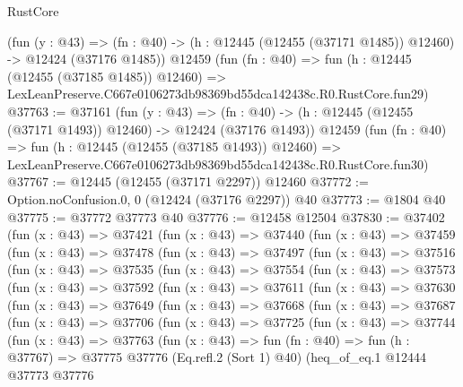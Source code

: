 \begin{lexlean}{RustCore}
\begin{coremodule}
    (fun (y : @43) =>
    (fn : @40) -> (h : @12445 (@12455 (@37171 @1485)) @12460) -> @12424 (@37176 @1485))
    @12459
    (fun (fn : @40) =>
    fun (h : @12445 (@12455 (@37185 @1485)) @12460) =>
    LexLeanPreserve.C667e0106273db98369bd55dca142438c.R0.RustCore.fun29)
@37763 := @37161
    (fun (y : @43) =>
    (fn : @40) -> (h : @12445 (@12455 (@37171 @1493)) @12460) -> @12424 (@37176 @1493))
    @12459
    (fun (fn : @40) =>
    fun (h : @12445 (@12455 (@37185 @1493)) @12460) =>
    LexLeanPreserve.C667e0106273db98369bd55dca142438c.R0.RustCore.fun30)
@37767 := @12445 (@12455 (@37171 @2297)) @12460
@37772 := Option.noConfusion.{0, 0} (@12424 (@37176 @2297)) @40
@37773 := @1804 @40
@37775 := @37772 @37773 @40
@37776 := @12458 @12504
@37830 := @37402
    (fun (x : @43) =>
    @37421
      (fun (x : @43) =>
      @37440
        (fun (x : @43) =>
        @37459
          (fun (x : @43) =>
          @37478
            (fun (x : @43) =>
            @37497
              (fun (x : @43) =>
              @37516
                (fun (x : @43) =>
                @37535
                  (fun (x : @43) =>
                  @37554
                    (fun (x : @43) =>
                    @37573
                      (fun (x : @43) =>
                      @37592
                        (fun (x : @43) =>
                        @37611
                          (fun (x : @43) =>
                          @37630
                            (fun (x : @43) =>
                            @37649
                              (fun (x : @43) =>
                              @37668
                                (fun (x : @43) =>
                                @37687
                                  (fun (x : @43) =>
                                  @37706
                                    (fun (x : @43) =>
                                    @37725
                                      (fun (x : @43) =>
                                      @37744
                                        (fun (x : @43) =>
                                        @37763
                                          (fun (x : @43) =>
                                          fun (fn : @40) =>
                                          fun (h : @37767) =>
                                          @37775
                                            @37776
                                            (Eq.refl.{2} (Sort 1) @40)
                                            (heq_of_eq.{1}
                                              @12444
                                              @37773
                                              @37776

\end{coremodule}
\end{lexlean}
